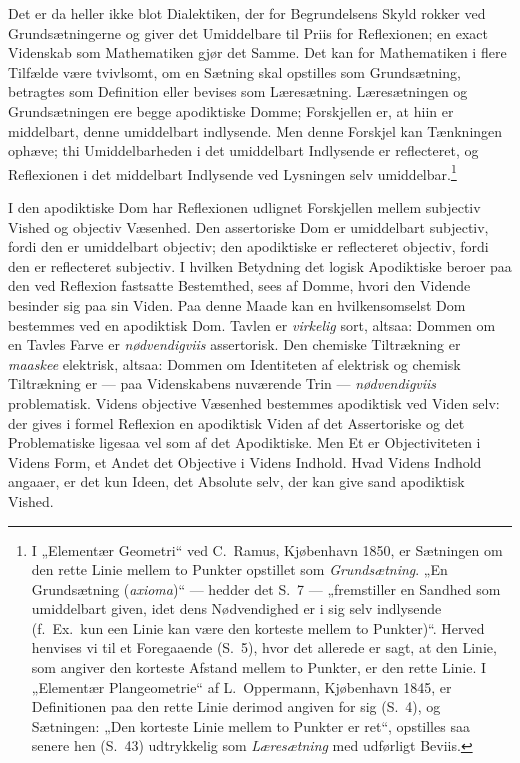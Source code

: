 \documentclass[12pt]{book}
\newcommand{\opage}[1]{\marginnote{\footnotesize\textit{[#1]}}}
\begin{document}
Det er da heller ikke blot Dialektiken, der for Begrundelsens Skyld rokker ved Grundsætningerne og giver det Umiddelbare til Priis for Reflexionen; en exact Videnskab som Mathematiken gjør det Samme. Det kan for Mathematiken i flere Tilfælde være tvivlsomt, om en Sætning skal opstilles som Grundsætning, betragtes som Definition eller bevises som Læresætning. Læresætningen og Grundsætningen ere begge apodiktiske Domme; Forskjellen er, at hiin er middelbart, denne umiddelbart indlysende. Men denne Forskjel kan Tænkningen ophæve; thi Umiddelbarheden i det umiddelbart Indlysende er reflecteret, og Reflexionen i det middelbart Indlysende ved Lysningen selv umiddelbar.\footnote{I „Elementær Geometri“ ved C.\ Ramus, Kjøbenhavn 1850, er Sætningen om den rette Linie mellem to Punkter opstillet som \emph{Grundsætning}. „En Grundsætning (\textit{axioma})“ --- hedder det S.~7 --- „fremstiller en Sandhed som umiddelbart given, idet dens Nødvendighed er i sig selv indlysende (f.\ Ex.\ kun een Linie kan være den korteste mellem to Punkter)“. Herved henvises vi til et Foregaaende (S.~5), hvor det allerede er sagt, at den Linie, som angiver den korteste Afstand mellem to Punkter, er den rette Linie. I „Elementær Plangeometrie“ af L.\ Oppermann, Kjøbenhavn 1845, er Definitionen paa den rette Linie derimod angiven for sig (S.~4),
og Sætningen: „Den korteste Linie mellem to Punkter er ret“, opstilles saa senere hen (S.~43) udtrykkelig som \emph{Læresætning} med udførligt Beviis.}%

\opage{260}I den apodiktiske Dom har Reflexionen udlignet Forskjellen mellem subjectiv Vished og objectiv Væsenhed. Den assertoriske Dom er umiddelbart subjectiv, fordi den er umiddelbart objectiv; den apodiktiske er reflecteret objectiv, fordi den er reflecteret subjectiv. I hvilken Betydning det logisk Apodiktiske beroer paa den ved Reflexion fastsatte Bestemthed, sees af Domme, hvori den Vidende besinder sig paa sin Viden. Paa denne Maade kan en hvilkensomselst Dom bestemmes ved en apodiktisk Dom. Tavlen er \emph{virkelig} sort, altsaa: Dommen om en Tavles Farve er \emph{nødvendigviis} assertorisk. Den chemiske Tiltrækning er \emph{maaskee} elektrisk, altsaa: Dommen om Identiteten af elektrisk og chemisk Tiltrækning er --- paa Videnskabens nuværende Trin --- \emph{nødvendigviis} problematisk. Videns objective Væsenhed bestemmes apodiktisk ved Viden selv: der gives i formel Reflexion en apodiktisk Viden af det Assertoriske og det Problematiske ligesaa vel som af det Apodiktiske. Men Et er Objectiviteten i Videns Form, et Andet det Objective i Videns Indhold. Hvad Videns Indhold angaaer, er det kun Ideen, det Absolute selv, der kan give sand apodiktisk Vished.
\end{document}
